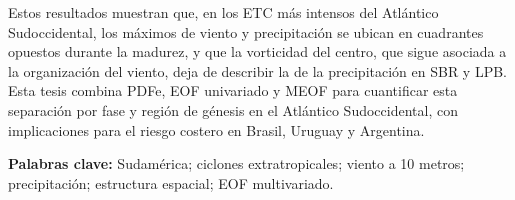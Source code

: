 Estos resultados muestran que, en los ETC más intensos del Atlántico Sudoccidental, los máximos de viento y precipitación se ubican en cuadrantes opuestos durante la madurez, y que la vorticidad del centro, que sigue asociada a la organización del viento, deja de describir la de la precipitación en SBR y LPB.
Esta tesis combina PDFe, EOF univariado y MEOF para cuantificar esta separación por fase y región de génesis en el Atlántico Sudoccidental, con implicaciones para el riesgo costero en Brasil, Uruguay y Argentina.

\vspace{1cm}

\noindent \textbf{Palabras clave:} Sudamérica; ciclones extratropicales; viento a 10 metros; precipitación; estructura espacial; EOF multivariado.
